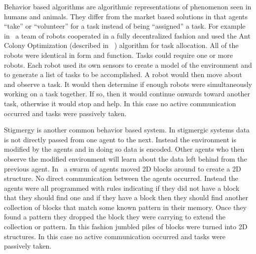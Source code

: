 Behavior based algorithms are algorithmic representations of phenomenon seen in humans and animals. They differ from the market based solutions in that agents ``take'' or ``volunteer'' for a task instead of being ``assigned'' a task.  For example in~\citet{ant_colony_opt} a team of robots cooperated in a fully decentralized fashion and used the Ant Colony Optimization (described in ~\citet{wiki:aco}) algorithm for task allocation.  All of the robots were identical in form and function.  Tasks could require one or more robots.  Each robot used its own sensors to create a model of the environment and to generate a list of tasks to be accomplished.  A robot would then move about and observe a task.  It would then determine if enough robots were simultaneously working on a task together.  If so, then it would continue onwards toward another task, otherwise it would stop and help.  In this case no active communication occurred and tasks were passively taken.

Stigmergy is another common behavior based system.  In stigmergic systems data is not directly passed from one agent to the next.  Instead the environment is modified by the agents and in doing so data is encoded.  Other agents who then observe the modified environment will learn about the data left behind from the previous agent.  In~\citet{stigmergy_building} a swarm of agents moved 2D blocks around to create a 2D structure.  No direct communication between the agents occurred.  Instead the agents were all programmed with rules indicating if they did not have a block that they should find one and if they have a block then they should find another collection of blocks that match some known pattern in their memory.  Once they found a pattern they dropped the block they were carrying to extend the collection or pattern.  In this fashion jumbled piles of blocks were turned into 2D structures.  In this case no active communication occurred and tasks were passively taken.

